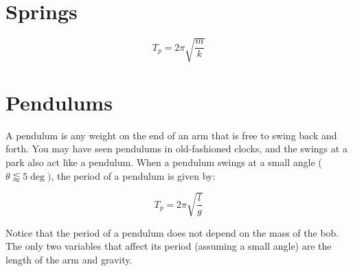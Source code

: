 	\section{Springs}
	
		\begin{mdframed}[backgroundcolor=orange!20!white]
		\begin{equation}
		T_p = 2 \pi \sqrt{\frac{m}{k}}
		\label{eqn:springperiod}
		\end{equation}
	\end{mdframed}
	
	\section{Pendulums}
	A pendulum is any weight on the end of an arm that is free to swing back and forth.  You may have seen pendulums in old-fashioned clocks, and the swings at a park also act like a pendulum.  When a pendulum swings at a small angle ($\theta \lessapprox 5 \deg)$, the period of a pendulum is given by:
	
	\begin{mdframed}[backgroundcolor=orange!20!white]
		\begin{equation}
			T_p = 2 \pi \sqrt{\frac{l}{g}}
			\label{eqn:pendulumperiod}
		\end{equation}
	\end{mdframed}
	
	Notice that the period of a pendulum does not depend on the mass of the bob.  The only two variables that affect its period (assuming a small angle) are the length of the arm and gravity.  
	
	
	 
	

		


	



